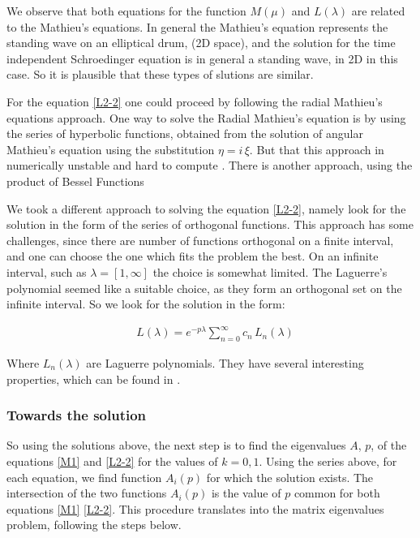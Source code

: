 We observe that both equations for the function $ M(\mu) $ and $ L(\lambda) $ are related to the Mathieu's equations. In general the Mathieu's equation represents the standing wave on an elliptical drum, (2D space),  and the solution for the time independent Schroedinger equation is in general a standing wave, in 2D in this case. So it is plausible that these types of slutions are similar.

For the equation \eqref{L2-2} one could proceed by following the radial Mathieu's equations approach. One way to solve the Radial Mathieu's equation is by using the series of hyperbolic functions, obtained from the solution of angular Mathieu's equation using the substitution $ \eta = i\,\xi$.  But that this approach in numerically unstable and hard to compute \cite{Mathieu4}. There is another approach, using the product of Bessel Functions \cite{Mathieu4}

We took a different approach to solving the equation \eqref{L2-2}, namely look for the solution in the form of the series of orthogonal functions. This approach has some challenges, since there are number of functions orthogonal on a finite interval, and one can choose the one which fits the problem the best. On an infinite interval, such as $ \lambda = [1, \infty] $ the choice is somewhat limited. The Laguerre's polynomial seemed like a suitable choice, as they form an orthogonal set on the infinite interval. So we look for the solution in the form:

\begin{equation}\label{Lsol1}
\begin{split}
& L(\lambda) =  e^{-p\lambda}\sum_{n=0}^{\infty}{c_n\,L_n(\lambda)}
\end{split}
\end{equation}

Where $ L_n(\lambda) $ are Laguerre polynomials. They have several interesting properties, which can be found in \cite{Laguerre1}.

\subsubsection{ Towards the solution }

So using the solutions above, the next step is to find the eigenvalues $ A $, $ p $, of the equations \eqref{M1} and \eqref{L2-2} for the values of $ k = 0,1 $. Using the series above, for each equation, we find function  $ A_i(p) $ for which the solution exists. The intersection of the two functions $ A_i(p) $ is the value of $ p $ common for both equations \eqref{M1} \eqref{L2-2}. This procedure translates into the matrix eigenvalues problem, following the steps below.

